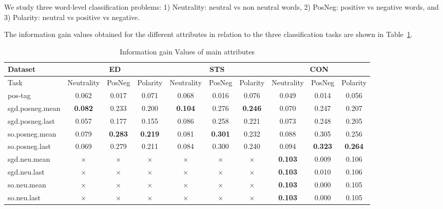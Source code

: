 \documentclass{sig-alternate}
\begin{document}



We study three word-level classification problems: 1) Neutrality: neutral vs non neutral words, 2) PosNeg: positive vs negative words, and 3) Polarity: neutral vs positive vs negative.

The information gain values obtained for the different attributes in relation to the three classification tasks are shown in Table~\ref{tab:infogains}.
 
 
\begin{table}[htbp]
\begin{center}
\begin{tabular}{l|ccc|ccc|ccc}
\hline
Dataset & \multicolumn{3}{c|}{ED} & \multicolumn{3}{c|}{STS} & \multicolumn{3}{c}{CON} \\ \hline
 Task &  Neutrality & PosNeg & Polarity &  Neutrality & PosNeg & Polarity &  Neutrality & PosNeg & Polarity  \\ \hline
pos-tag &  0.062 & 0.017  & 0.071 & 0.068 & 0.016 & 0.076 & 0.049 & 0.014 & 0.056 \\ 
sgd.posneg.mean & \textbf{0.082}  & 0.233  &  0.200 & \textbf{0.104} & 0.276 & \textbf{0.246} & 0.070 & 0.247  & 0.207  \\ 
sgd.posneg.last & 0.057 & 0.177 & 0.155  & 0.086 & 0.258 & 0.221 &  0.073 & 0.248 & 0.205 \\ 
so.posneg.mean & 0.079 & \textbf{0.283} & \textbf{0.219}  & 0.081 & \textbf{0.301} & 0.232 & 0.088 & 0.305 & 0.256 \\ 
so.posneg.last & 0.069 & 0.279  &  0.211 & 0.084 & 0.300 & 0.240 & 0.094 & \textbf{0.323} & \textbf{0.264} \\ 
sgd.neu.mean & $\times$ & $\times$ & $\times$ & $\times$ & $\times$ & $\times$ & \textbf{0.103} & 0.009  & 0.106 \\ 
sgd.neu.last & $\times$ & $\times$  & $\times$ & $\times$ & $\times$ & $\times$ & \textbf{0.103} & 0.010 & 0.106 \\ 
so.neu.mean & $\times$ & $\times$  & $\times$ & $\times$ & $\times$ & $\times$ & \textbf{0.103} & 0.000 & 0.105 \\ 
so.neu.last & $\times$ & $\times$ & $\times$ & $\times$ & $\times$ & $\times$ & \textbf{0.103} & 0.000 & 0.105 \\ \hline
\end{tabular}
\end{center}
\caption{Information gain Values of main attributes}
\label{tab:infogains}
\end{table}
\end{document}
